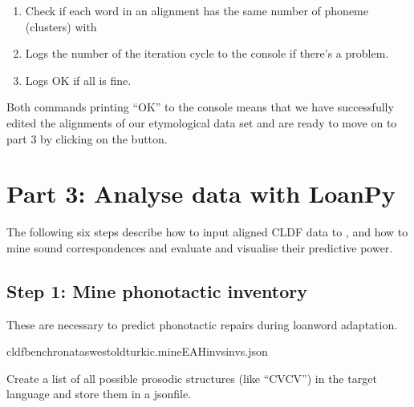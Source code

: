 \documentclass[letterpaper,10pt,english]{sphinxmanual}
\begin{document}
{{{{\begin{fulllineitems}
\begin{enumerate}
\item {} 
\sphinxAtStartPar
Check if each word in an alignment has the same number of
phoneme (clusters) with 

\item {} 
\sphinxAtStartPar
Logs the number of the iteration cycle to the console if there’s a
problem.

\item {} 
\sphinxAtStartPar
Logs OK if all is fine.

\end{enumerate}

\end{fulllineitems}


\sphinxAtStartPar
Both commands printing “OK” to the console means that we have successfully
edited the alignments of our etymological data set and are ready to move on
to part 3 by clicking on the  button.

\sphinxstepscope


\chapter{Part 3: Analyse data with LoanPy}
\label{\detokenize{mkloanpy:part-3-analyse-data-with-loanpy}}\label{\detokenize{mkloanpy::doc}}
\sphinxAtStartPar
The following six steps describe how to input aligned CLDF data to , and how to mine sound
correspondences and evaluate and visualise their predictive power.


\section{Step 1: Mine phonotactic inventory}
\label{\detokenize{mkloanpy:step-1-mine-phonotactic-inventory}}
\sphinxAtStartPar
These are necessary to predict phonotactic repairs during loanword adaptation.

\begin{sphinxVerbatim}[commandchars=\\\{\}]
cldfbenchronataswestoldturkic.mineEAHinvsinvs.json
\end{sphinxVerbatim}
\label{\detokenize{mkloanpy:module-ronataswestoldturkiccommands.mineEAHinvs}}
\sphinxAtStartPar
Create a list of all possible prosodic structures (like “CVCV”) in the
target language and store them in a json\sphinxhyphen{}file.

}}}}
\end{document}
